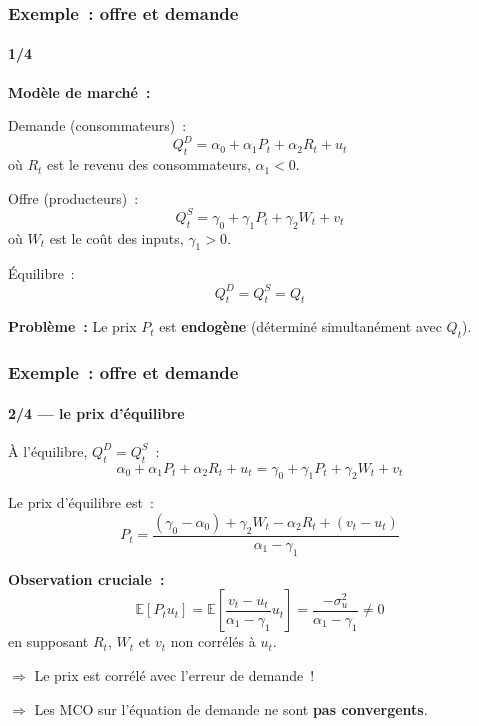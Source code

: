 \documentclass[10pt]{beamer}
\begin{document}
\begin{frame}
  \frametitle{Exemple~: offre et demande}
  \framesubtitle{1/4}

  \textbf{Modèle de marché~:}

  Demande (consommateurs)~:
  \[ Q_t^D = \alpha_0 + \alpha_1 P_t + \alpha_2 R_t + u_t \]
  où $R_t$ est le revenu des consommateurs, $\alpha_1 < 0$.

  \medskip

  Offre (producteurs)~:
  \[ Q_t^S = \gamma_0 + \gamma_1 P_t + \gamma_2 W_t + v_t \]
  où $W_t$ est le coût des inputs, $\gamma_1 > 0$.

  \medskip

  Équilibre~:
  \[ Q_t^D = Q_t^S = Q_t \]

  \medskip

  \textbf{Problème~:} Le prix $P_t$ est \textbf{endogène} (déterminé
  simultanément avec $Q_t$).

\end{frame}


\begin{frame}
  \frametitle{Exemple~: offre et demande}
  \framesubtitle{2/4 --- le prix d'équilibre}

  À l'équilibre, $Q_t^D = Q_t^S$~:
  \[ \alpha_0 + \alpha_1 P_t + \alpha_2 R_t + u_t = \gamma_0 + \gamma_1 P_t + \gamma_2 W_t + v_t \]

  \medskip

  Le prix d'équilibre est~:
  \[ P_t = \frac{(\gamma_0 - \alpha_0) + \gamma_2 W_t - \alpha_2 R_t + (v_t - u_t)}{\alpha_1 - \gamma_1} \]

  \medskip

  \textbf{Observation cruciale~:}
  \[ \mathbb{E}[P_t u_t] = \mathbb{E}\left[\frac{v_t - u_t}{\alpha_1 - \gamma_1} u_t\right] = \frac{-\sigma_u^2}{\alpha_1 - \gamma_1} \neq 0 \]
  en supposant $R_t$, $W_t$ et $v_t$ non corrélés à $u_t$.

  \medskip

  $\Rightarrow$ Le prix est corrélé avec l'erreur de demande~!

  $\Rightarrow$ Les MCO sur l'équation de demande ne sont \textbf{pas convergents}.

\end{frame}
\end{document}
